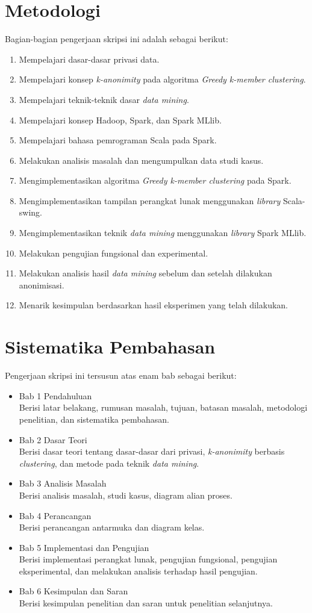 \section{Metodologi}
\label{sec:metlit}
Bagian-bagian pengerjaan skripsi ini adalah sebagai berikut:
\begin{enumerate}
\item Mempelajari dasar-dasar privasi data.
\item Mempelajari konsep {\it k-anonimity} pada algoritma {\it Greedy k-member clustering}.
\item Mempelajari teknik-teknik dasar {\it data mining}.
\item Mempelajari konsep Hadoop, Spark, dan Spark MLlib.
\item Mempelajari bahasa pemrograman Scala pada Spark.
\item Melakukan analisis masalah dan mengumpulkan data studi kasus.
\item Mengimplementasikan algoritma {\it Greedy k-member clustering } pada Spark.
\item Mengimplementasikan tampilan perangkat lunak menggunakan {\it library} Scala-swing.
\item Mengimplementasikan teknik {\it data mining} menggunakan {\it library} Spark MLlib.
\item Melakukan pengujian fungsional dan experimental.
\item Melakukan analisis hasil {\it data mining} sebelum dan setelah dilakukan anonimisasi.
\item Menarik kesimpulan berdasarkan hasil eksperimen yang telah dilakukan.
\end{enumerate}

\newpage
\section{Sistematika Pembahasan}
\label{sec:sispem}
Pengerjaan skripsi ini tersusun atas enam bab sebagai berikut:
\begin{itemize}
\item Bab 1 Pendahuluan\\
Berisi latar belakang, rumusan masalah, tujuan, batasan masalah, metodologi penelitian, dan sistematika pembahasan.
\item Bab 2 Dasar Teori\\
Berisi dasar teori tentang dasar-dasar dari privasi, {\it k-anonimity} berbasis {\it clustering}, dan metode pada teknik {\it data mining}.
\item Bab 3 Analisis Masalah\\
Berisi analisis masalah, studi kasus, diagram alian proses.
\item Bab 4 Perancangan \\
Berisi perancangan antarmuka dan diagram kelas.
\item Bab 5 Implementasi dan Pengujian\\
Berisi implementasi perangkat lunak, pengujian fungsional, pengujian eksperimental, dan melakukan analisis terhadap hasil pengujian.
\item Bab 6 Kesimpulan dan Saran\\
Berisi kesimpulan penelitian dan saran untuk penelitian selanjutnya.
\end{itemize}
